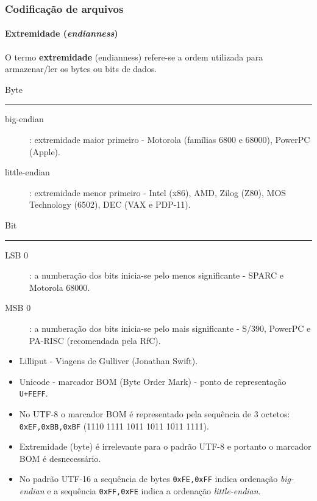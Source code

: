 \begin{frame}[allowframebreaks]
\frametitle{Codificação de arquivos}
\framesubtitle{Extremidade (\textit{endianness})}
  O termo \textbf{extremidade} (endianness) refere-se a ordem utilizada para armazenar/ler os bytes ou bits de dados.

  Byte 
  \hrule
  \begin{description}
  \item[big-endian]: extremidade maior primeiro -  Motorola (famílias 6800 e 68000), PowerPC (Apple).
  \item[little-endian]: extremidade menor primeiro - Intel (x86), AMD, Zilog (Z80), MOS Technology (6502), DEC (VAX e PDP-11).
  \end{description}

  Bit
  \hrule
  \begin{description}
  \item[LSB 0]: a numberação dos bits inicia-se pelo menos significante - SPARC e Motorola 68000.
  \item[MSB 0]: a numberação dos bits inicia-se pelo mais significante - S/390, PowerPC e PA-RISC (recomendada pela RfC).
  \end{description}

  \begin{itemize}
  \item Lilliput - Viagens de Gulliver (Jonathan Swift).
  \item Unicode - marcador BOM (Byte Order Mark) - ponto de representação \texttt{U+FEFF}.
  \item No UTF-8 o marcador BOM é representado pela sequência de 3 octetos: \texttt{0xEF,0xBB,0xBF} (1110 1111 1011 1011 1011 1111).
  \item Extremidade (byte) é irrelevante para o padrão UTF-8 e portanto o marcador BOM é desnecessário.
  \item No padrão UTF-16 a sequência de bytes \texttt{0xFE,0xFF} indica ordenação \textit{big-endian} e a sequência \texttt{0xFF,0xFE}
        indica a ordenação \textit{little-endian}.
  \end{itemize}

\end{frame}


